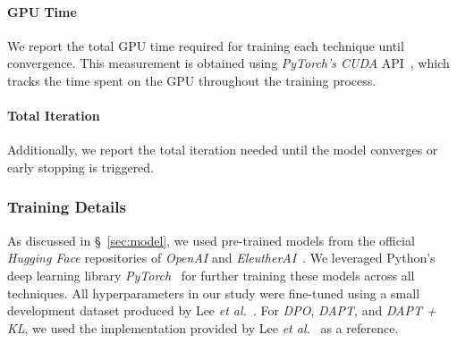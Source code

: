 \paragraph{GPU Time} We report the total GPU time required for training each technique until convergence. This measurement is obtained using \textit{PyTorch's CUDA} API~\cite{torchcuda}, which tracks the time spent on the GPU throughout the training process.


\paragraph{Total Iteration} Additionally, we report the total iteration needed until the model converges or early stopping is triggered. 








\subsubsection{Training Details}

As discussed in \S~\ref{sec:model}, we used pre-trained models from the official \textit{Hugging Face} repositories of \textit{OpenAI} and \textit{EleutherAI}~\cite{gpthf, gptneohf}. We leveraged Python's deep learning library \textit{PyTorch}~\cite{paszke2017automatic} for further training these models across all techniques. All hyperparameters in our study were fine-tuned using a small development dataset produced by Lee \textit{et al.}~\cite{lee2024mechanistic}. For \textit{DPO}, \textit{DAPT}, and \textit{DAPT + KL}, we used the implementation provided by Lee \textit{et al.}~\cite{lee2024mechanistic} as a reference. 

